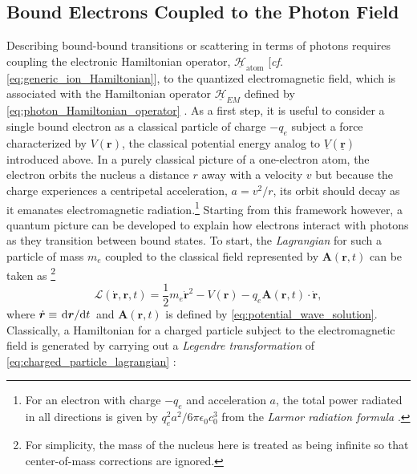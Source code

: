 \subsection{Bound Electrons Coupled to the Photon Field}\label{sec:ions_EM}
Describing bound-bound transitions or scattering in terms of photons requires coupling the electronic Hamiltonian operator, $\underline{\mathcal{H}}_{\text{atom}}$ [\emph{cf.\@} \cref{eq:generic_ion_Hamiltonian}], to the quantized electromagnetic field, which is associated with the Hamiltonian operator $\underline{\mathcal{H}}_{EM}$ defined by \cref{eq:photon_Hamiltonian_operator} \cite{Shankar04,Townsend00,Fontana_82,kapitell4,wysin2011quantization}. 
As a first step, it is useful to consider a single bound electron as a classical particle of charge $-q_e$ subject a force characterized by $V(\mathbold{r})$, the classical potential energy analog to $\underline{V}(\underline{\mathbold{r}})$ introduced above. 
In a purely classical picture of a one-electron atom, the electron orbits the nucleus a distance $r$ away with a velocity $v$ but because the charge experiences a centripetal acceleration, $a = v^2 / r$, its orbit should decay as it emanates electromagnetic radiation.\footnote{For an electron with charge $-q_e$ and acceleration $a$, the total power radiated in all directions is given by $q_e^2 a^2 /6 \pi \epsilon_0 c_0^3$ from the \emph{Larmor radiation formula} \cite{Jackson75,Rybicki86}.} 
Starting from this framework however, a quantum picture can be developed to explain how electrons interact with photons as they transition between bound states. 
To start, the \emph{Lagrangian} for such a particle of mass $m_e$ coupled to the classical field represented by $\mathbold{A} ( \mathbold{r} , t )$ can be taken as \cite{Landau75,Landau76,Kahn02,Goldstein02}\footnote{For simplicity, the mass of the nucleus here is treated as being infinite so that center-of-mass corrections are ignored.}
\begin{equation}\label{eq:charged_particle_lagrangian}
 \mathcal{L} \left( \dot{\mathbold{r}}, \mathbold{r} , t \right) = \frac{1}{2} m_e \dot{\mathbold{r}}^2 - V (\mathbold{r}) - q_e \mathbold{A} ( \mathbold{r} , t ) \cdot \dot{\mathbold{r}} ,
 \end{equation}
where $\dot{\mathbold{r}} \equiv \dv*{\mathbold{r}}{t}$ and $\mathbold{A} ( \mathbold{r} , t )$ is defined by \cref{eq:potential_wave_solution}. 
Classically, a Hamiltonian for a charged particle subject to the electromagnetic field is generated by carrying out a \emph{Legendre transformation} of \cref{eq:charged_particle_lagrangian} \cite{Landau75,Landau76,Goldstein02}: 
